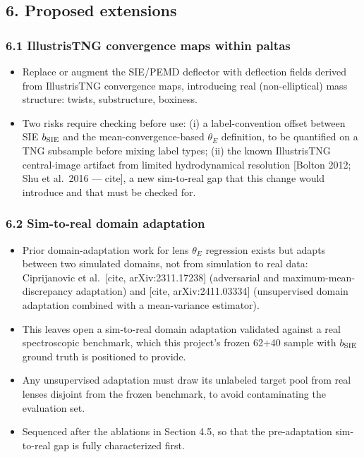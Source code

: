 \documentclass[
  11pt,
]{article}
\providecommand{\tightlist}{%
  \setlength{\itemsep}{0pt}\setlength{\parskip}{0pt}}
\begin{document}
\hypertarget{proposed-extensions}{%
\subsection{6. Proposed extensions}\label{proposed-extensions}}

\hypertarget{illustristng-convergence-maps-within-paltas}{%
\subsubsection{6.1 IllustrisTNG convergence maps within
paltas}\label{illustristng-convergence-maps-within-paltas}}

\begin{itemize}
\tightlist
\item
  Replace or augment the SIE/PEMD deflector with deflection fields
  derived from IllustrisTNG convergence maps, introducing real
  (non-elliptical) mass structure: twists, substructure, boxiness.
\item
  Two risks require checking before use: (i) a label-convention offset
  between SIE \(b_{\rm SIE}\) and the mean-convergence-based
  \(\theta_E\) definition, to be quantified on a TNG subsample before
  mixing label types; (ii) the known IllustrisTNG central-image artifact
  from limited hydrodynamical resolution {[}Bolton 2012; Shu et al.~2016
  --- cite{]}, a new sim-to-real gap that this change would introduce
  and that must be checked for.
\end{itemize}

\hypertarget{sim-to-real-domain-adaptation}{%
\subsubsection{6.2 Sim-to-real domain
adaptation}\label{sim-to-real-domain-adaptation}}

\begin{itemize}
\tightlist
\item
  Prior domain-adaptation work for lens \(\theta_E\) regression exists
  but adapts between two simulated domains, not from simulation to real
  data: Ciprijanovic et al.~{[}cite, arXiv:2311.17238{]} (adversarial
  and maximum-mean-discrepancy adaptation) and {[}cite,
  arXiv:2411.03334{]} (unsupervised domain adaptation combined with a
  mean-variance estimator).
\item
  This leaves open a sim-to-real domain adaptation validated against a
  real spectroscopic benchmark, which this project's frozen 62+40 sample
  with \(b_{\rm SIE}\) ground truth is positioned to provide.
\item
  Any unsupervised adaptation must draw its unlabeled target pool from
  real lenses disjoint from the frozen benchmark, to avoid contaminating
  the evaluation set.
\item
  Sequenced after the ablations in Section 4.5, so that the
  pre-adaptation sim-to-real gap is fully characterized first.
\end{itemize}
\end{document}
